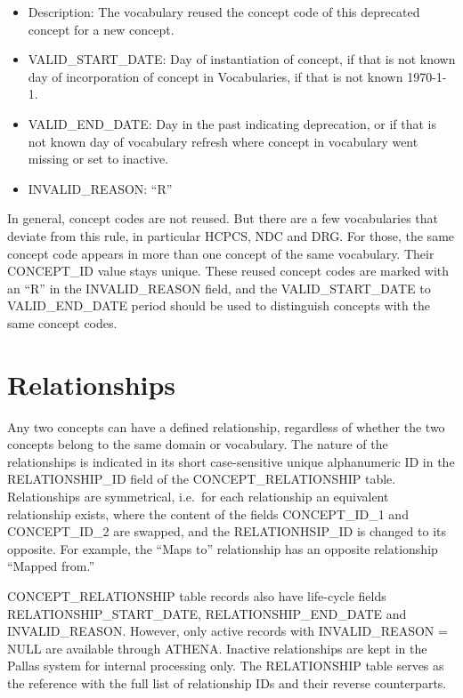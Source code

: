 \documentclass[11pt]{book}
\providecommand{\tightlist}{%
  \setlength{\itemsep}{0pt}\setlength{\parskip}{0pt}}
\theoremstyle{definition}
\theoremstyle{definition}
\theoremstyle{definition}
\theoremstyle{remark}
\begin{document}
\begin{itemize}
  \begin{itemize}
  \tightlist
  \item
    Description: The vocabulary reused the concept code of this
    deprecated concept for a new concept.
  \item
    VALID\_START\_DATE: Day of instantiation of concept, if that is not
    known day of incorporation of concept in Vocabularies, if that is
    not known 1970-1-1.
  \item
    VALID\_END\_DATE: Day in the past indicating deprecation, or if that
    is not known day of vocabulary refresh where concept in vocabulary
    went missing or set to inactive.
  \item
    INVALID\_REASON: ``R''
  \end{itemize}
\end{itemize}

In general, concept codes are not reused. But there are a few
vocabularies that deviate from this rule, in particular HCPCS, NDC and
DRG. For those, the same concept code appears in more than one concept
of the same vocabulary. Their CONCEPT\_ID value stays unique. These
reused concept codes are marked with an ``R'' in the INVALID\_REASON
field, and the VALID\_START\_DATE to VALID\_END\_DATE period should be
used to distinguish concepts with the same concept codes.

\section{Relationships}\label{relationships}

Any two concepts can have a defined relationship, regardless of whether
the two concepts belong to the same domain or vocabulary. The nature of
the relationships is indicated in its short case-sensitive unique
alphanumeric ID in the RELATIONSHIP\_ID field of the
CONCEPT\_RELATIONSHIP table. Relationships are symmetrical, i.e.~for
each relationship an equivalent relationship exists, where the content
of the fields CONCEPT\_ID\_1 and CONCEPT\_ID\_2 are swapped, and the
RELATIONHSIP\_ID is changed to its opposite. For example, the ``Maps
to'' relationship has an opposite relationship ``Mapped from.''

CONCEPT\_RELATIONSHIP table records also have life-cycle fields
RELATIONSHIP\_START\_DATE, RELATIONSHIP\_END\_DATE and INVALID\_REASON.
However, only active records with INVALID\_REASON = NULL are available
through ATHENA. Inactive relationships are kept in the Pallas system for
internal processing only. The RELATIONSHIP table serves as the reference
with the full list of relationship IDs and their reverse counterparts.
\end{document}
